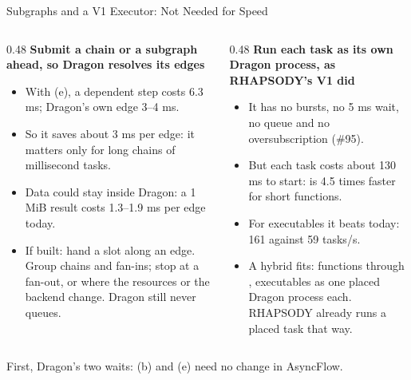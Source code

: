 \documentclass[aspectratio=169, 10pt, t]{beamer}
\begin{document}
\begin{frame}{Subgraphs and a V1 Executor: Not Needed for Speed}
\bodysmall
\begin{columns}[T]
\begin{column}{0.48\textwidth}
\textbf{Submit a chain or a subgraph ahead, so Dragon resolves its edges}
\begin{itemize}
  \item With (e), a dependent step costs 6.3 ms; Dragon's own edge 3--4 ms.
  \item So it saves about 3 ms per edge: it matters only for long chains of millisecond tasks.
  \item Data could stay inside Dragon: a 1 MiB result costs 1.3--1.9 ms per edge today.
  \item If built: hand a slot along an edge. Group chains and fan-ins; stop at a fan-out, or where the resources or the backend change. Dragon still never queues.
\end{itemize}
\end{column}
\begin{column}{0.48\textwidth}
\textbf{Run each task as its own Dragon process, as RHAPSODY's V1 did}
\begin{itemize}
  \item It has no bursts, no 5 ms wait, no  queue and no oversubscription (\#95).
  \item But each task costs about 130 ms to start:  is 4.5 times faster for short functions.
  \item For executables it beats  today: 161 against 59 tasks/s.
  \item A hybrid fits: functions through , executables as one placed Dragon process each. RHAPSODY already runs a placed task that way.
\end{itemize}
\end{column}
\end{columns}
\vfill
\begin{center}
  {\fontsize{11}{13}\selectfont\color{titleink}First, Dragon's two waits: (b) and (e) need no change in AsyncFlow.}
\end{center}
\vfill
\end{frame}

\end{document}
